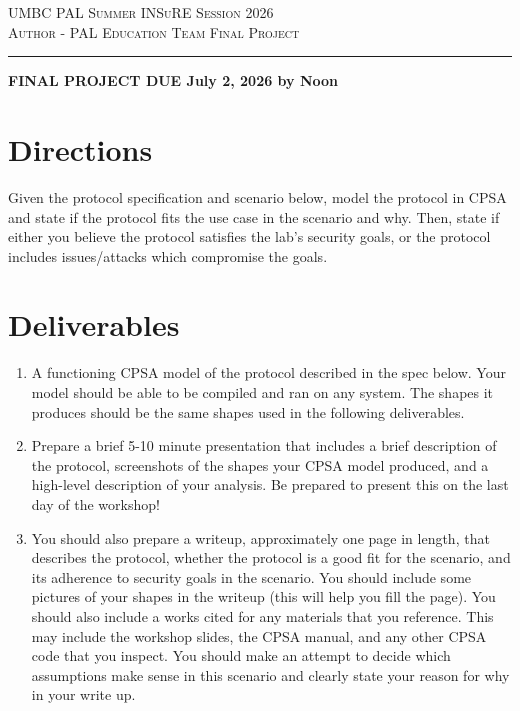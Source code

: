 \documentclass[12pt]{article}
\begin{document}
\noindent
{\scshape UMBC PAL} \hfill {\scshape Summer INSuRE Session 2026} \\
{\scshape Author - PAL Education Team } \hfill {\scshape Final Project}
 
\smallskip
\hrule
\bigskip

\begin{center}
{\large \textbf{FINAL PROJECT DUE July 2, 2026 by Noon}}
\end{center}

\section{Directions}

Given the protocol specification and scenario below, model the protocol in CPSA and state if the protocol fits the use case in the scenario and why. 
Then, state if either you believe the protocol satisfies the lab's security goals, or the protocol includes issues/attacks which compromise the goals. 

\section{Deliverables}
\begin{enumerate}
    \item A functioning CPSA model of the protocol described in the spec below. Your model should be able to be compiled and ran on any system. The shapes it produces should be the same shapes used in the following deliverables.
    \item Prepare a brief 5-10 minute presentation that includes a brief description of the protocol, screenshots of the shapes your CPSA model produced, and a high-level description of your analysis. 
    Be prepared to present this on the last day of the workshop!
    \item You should also prepare a writeup, approximately one page in length, that describes the protocol, whether the protocol is a good fit for the scenario, and its adherence to security goals in the scenario.
You should include some pictures of your shapes in the writeup (this will help you fill the page).
You should also include a works cited for any materials that you reference. This may include the workshop slides, the CPSA manual, and any other CPSA code that you inspect.
You should make an attempt to decide which assumptions make sense in this scenario and clearly state your reason for why in your write up.
\end{enumerate}
\end{document}
